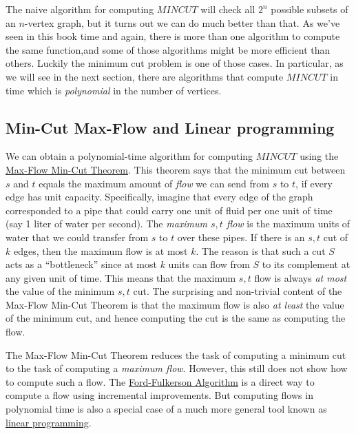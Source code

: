 The naive algorithm for computing \(\ensuremath{\mathit{MINCUT}}\) will
check all \(2^n\) possible subsets of an \(n\)-vertex graph, but it
turns out we can do much better than that. As we've seen in this book
time and again, there is more than one algorithm to compute the same
function,and some of those algorithms might be more efficient than
others. Luckily the minimum cut problem is one of those cases. In
particular, as we will see in the next section, there are algorithms
that compute \(\ensuremath{\mathit{MINCUT}}\) in time which is
\emph{polynomial} in the number of vertices.

\subsection{Min-Cut Max-Flow and Linear programming}\label{linerprogsec}

We can obtain a polynomial-time algorithm for computing
\(\ensuremath{\mathit{MINCUT}}\) using the
\href{https://en.wikipedia.org/wiki/Max-flow_min-cut_theorem}{Max-Flow
Min-Cut Theorem}. This theorem says that the minimum cut between \(s\)
and \(t\) equals the maximum amount of \emph{flow} we can send from
\(s\) to \(t\), if every edge has unit capacity. Specifically, imagine
that every edge of the graph corresponded to a pipe that could carry one
unit of fluid per one unit of time (say 1 liter of water per second).
The \emph{maximum \(s,t\) flow} is the maximum units of water that we
could transfer from \(s\) to \(t\) over these pipes. If there is an
\(s,t\) cut of \(k\) edges, then the maximum flow is at most \(k\). The
reason is that such a cut \(S\) acts as a ``bottleneck'' since at most
\(k\) units can flow from \(S\) to its complement at any given unit of
time. This means that the maximum \(s,t\) flow is always \emph{at most}
the value of the minimum \(s,t\) cut. The surprising and non-trivial
content of the Max-Flow Min-Cut Theorem is that the maximum flow is also
\emph{at least} the value of the minimum cut, and hence computing the
cut is the same as computing the flow.

The Max-Flow Min-Cut Theorem reduces the task of computing a minimum cut
to the task of computing a \emph{maximum flow}. However, this still does
not show how to compute such a flow. The
\href{https://en.wikipedia.org/wiki/Ford\%E2\%80\%93Fulkerson_algorithm}{Ford-Fulkerson
Algorithm} is a direct way to compute a flow using incremental
improvements. But computing flows in polynomial time is also a special
case of a much more general tool known as
\href{https://en.wikipedia.org/wiki/Linear_programming}{linear
programming}.

